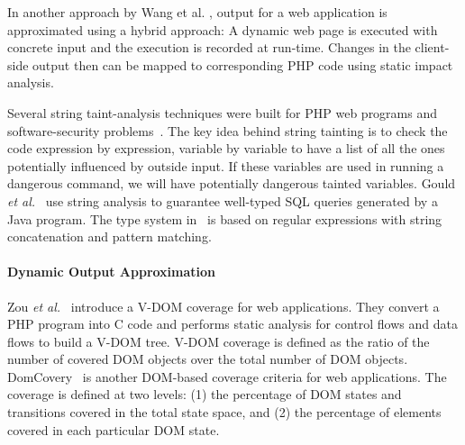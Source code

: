 In another approach by Wang et al. \cite{wang-fse12}, 
output for a web application is approximated using a hybrid approach: A
dynamic web page is executed with concrete input and the execution is
recorded at run-time. Changes in the client-side output then can be mapped to 
corresponding PHP code using static impact analysis.

Several string taint-analysis techniques were built for PHP web
programs and software-security
problems~\cite{kieyzun09,wassermann_static_2008,xieaiken06,tevfik11}.  The key idea
behind string tainting is to check the code expression by expression,
variable by variable to have a list of all the ones potentially
influenced by outside input.  If these variables are used in running a
dangerous command, we will have potentially dangerous tainted
variables.
%
Gould {\em et al.}~\cite{gould04} use string analysis to guarantee
well-typed SQL queries generated by a Java program. The type system
in~\cite{tabuchi03} is based on regular expressions with string
concatenation and pattern matching.

\paragraph{Dynamic Output Approximation}
Zou {\em et al.}~\cite{zou-issta14} introduce a V-DOM coverage for web
applications. They convert a PHP program into C code and performs
static analysis for control flows and data flows to build a V-DOM
tree. V-DOM coverage is defined as the ratio of the number of covered
DOM objects over the total number of DOM
objects. DomCovery~\cite{mesbah-issta14} is another DOM-based coverage
criteria for web applications. The coverage is defined at two levels:
(1) the percentage of DOM states and transitions covered in the total
state space, and (2) the percentage of elements covered in each
particular DOM state.


